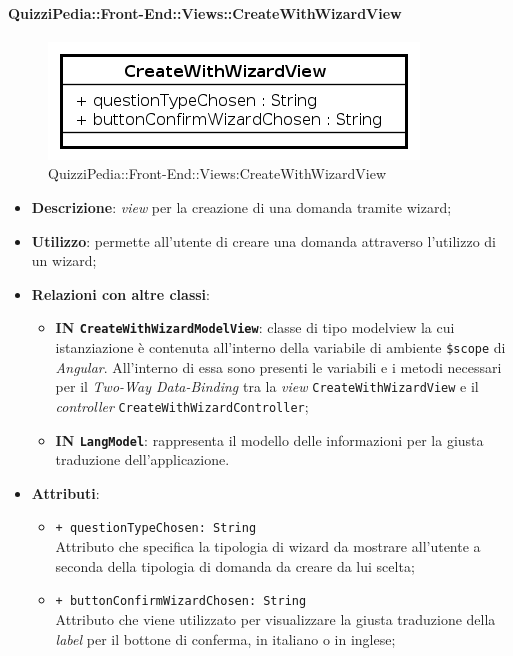 \paragraph{QuizziPedia::Front-End::Views::CreateWithWizardView}
\begin{figure} [ht]
	\centering
	\includegraphics[scale=0.80]{UML/Classi/Front-End/QuizziPedia_Front-end_Views_CreateWithWizardView.png}
	\caption{QuizziPedia::Front-End::Views:CreateWithWizardView}
\end{figure} \FloatBarrier
\begin{itemize}
	\item \textbf{Descrizione}: \textit{view} per la creazione di una domanda tramite wizard;
	\item \textbf{Utilizzo}: permette all'utente di creare una domanda attraverso l'utilizzo di un wizard;
	\item \textbf{Relazioni con altre classi}:
	\begin{itemize}
		\item \textbf{IN \texttt{CreateWithWizardModelView}}: classe di tipo modelview la cui istanziazione è contenuta all'interno della variabile di ambiente \texttt{\$scope} di \textit{Angular}. All'interno di essa sono presenti le variabili e i metodi necessari per il \textit{Two-Way Data-Binding} tra la \textit{view} \texttt{CreateWithWizardView} e il \textit{controller} \texttt{CreateWithWizardController};
		\item \textbf{IN \texttt{LangModel}}: rappresenta il modello delle informazioni per la giusta traduzione dell'applicazione.
	\end{itemize}
		\item \textbf{Attributi}:
		\begin{itemize}
			\item \texttt{+ questionTypeChosen: String} \\ Attributo che specifica la tipologia di wizard da mostrare all'utente a seconda della tipologia di domanda da creare da lui scelta;
			\item \texttt{+ buttonConfirmWizardChosen: String} \\ Attributo che viene utilizzato per visualizzare la giusta traduzione della \textit{label} per il bottone di conferma, in italiano o in inglese; 
		\end{itemize}
\end{itemize}